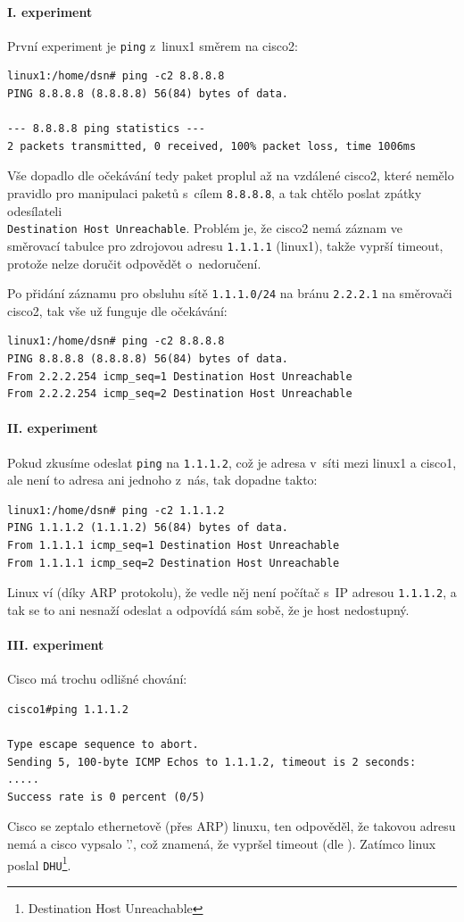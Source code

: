 \paragraph{I. experiment}
První experiment je \verb|ping| z~linux1 směrem na cisco2:
\begin{verbatim}
linux1:/home/dsn# ping -c2 8.8.8.8
PING 8.8.8.8 (8.8.8.8) 56(84) bytes of data.

--- 8.8.8.8 ping statistics ---
2 packets transmitted, 0 received, 100% packet loss, time 1006ms
\end{verbatim}

Vše dopadlo dle očekávání tedy paket proplul až na vzdálené cisco2, které nemělo pravidlo pro manipulaci paketů s~cílem \verb|8.8.8.8|, a tak chtělo poslat zpátky odesílateli \\\verb|Destination Host Unreachable|. Problém je, že cisco2 nemá záznam ve směrovací tabulce pro zdrojovou adresu \verb|1.1.1.1| (linux1), takže vyprší timeout, protože nelze doručit odpovědět o~nedoručení.

Po přidání záznamu pro obsluhu sítě \verb|1.1.1.0/24| na bránu \verb|2.2.2.1| na směrovači cisco2, tak vše už funguje dle očekávání:
\begin{verbatim}
linux1:/home/dsn# ping -c2 8.8.8.8
PING 8.8.8.8 (8.8.8.8) 56(84) bytes of data.
From 2.2.2.254 icmp_seq=1 Destination Host Unreachable
From 2.2.2.254 icmp_seq=2 Destination Host Unreachable
\end{verbatim} 


\paragraph{II. experiment}
Pokud zkusíme odeslat \verb|ping| na \verb|1.1.1.2|, což je adresa v~síti mezi linux1 a cisco1, ale není to adresa ani jednoho z~nás, tak dopadne takto:
\begin{verbatim}
linux1:/home/dsn# ping -c2 1.1.1.2
PING 1.1.1.2 (1.1.1.2) 56(84) bytes of data.
From 1.1.1.1 icmp_seq=1 Destination Host Unreachable
From 1.1.1.1 icmp_seq=2 Destination Host Unreachable
\end{verbatim} 
Linux ví (díky ARP protokolu), že vedle něj není počítač s~IP adresou \verb|1.1.1.2|, a tak se to ani nesnaží odeslat a odpovídá sám sobě, že je host nedostupný. 


\paragraph{III. experiment}
Cisco má trochu odlišné chování:
\begin{verbatim}
cisco1#ping 1.1.1.2

Type escape sequence to abort.
Sending 5, 100-byte ICMP Echos to 1.1.1.2, timeout is 2 seconds:
.....
Success rate is 0 percent (0/5)
\end{verbatim}
Cisco se zeptalo ethernetově (přes ARP) linuxu, ten odpověděl, že takovou adresu nemá a cisco vypsalo '.', což znamená, že vypršel timeout (dle \cite{cisco:icmp_codes}). Zatímco linux poslal \verb|DHU|\footnote{Destination Host Unreachable}.


